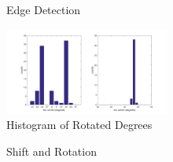 \documentclass[conference,twocolumn]{IEEEtran}
\begin{document}
\begin{figure}[!htbp]
    \centering
    \caption{Edge Detection}
    \label{fig:edgeDetect}
\end{figure}

\begin{figure}[!htbp]
\begin{center}
\includegraphics[width=0.48\textwidth]{fig/histogram.png}
\caption{Histogram of Rotated Degrees}
\label{fig: histogram}
\end{center}
\end{figure}

\begin{figure}[!htbp]
    \centering
    \caption{Shift and Rotation}
    \label{fig:rotation}
\end{figure}
\end{document}
